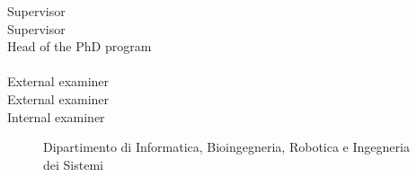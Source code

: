 

	 \hfill  {Supervisor}	\\
	 \hfill  {Supervisor}		
	\\
		\hfill  {Head of the PhD program}	
	\vspace{1em} \\
	\\
		\hfill  {External examiner}	
	\\
		\hfill  {External examiner}
	\\
			 \hfill  {Internal examiner}

\begin{figure}[h!]
 \centering
 
\begin{center} 
		\small{Dipartimento di Informatica, Bioingegneria, Robotica e Ingegneria dei Sistemi\\}
	\end{center}
\end{figure}
	


